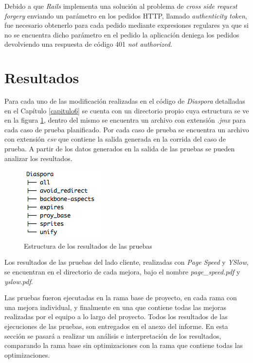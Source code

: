 Debido a que \emph{Rails} implementa una solución al problema de \emph{cross side request forgery}
enviando un parámetro en los pedidos HTTP, llamado \emph{authenticity token}, fue necesario obtenerlo
para cada pedido mediante expresiones regulares ya que si no se encuentra dicho parámetro en el pedido
la aplicación deniega los pedidos devolviendo una respuesta de código 401 \emph{not authorized}.
 
\section{Resultados}
\label{cap7:resultados}

Para cada uno de las modificación realizadas en el código de \emph{Diaspora} detalladas en el Capítulo \ref{capitulo6} se cuenta con un directorio propio cuya estructura se ve en la
figura \ref{fig.estructura_resultados}, dentro del mismo se encuentra un archivo con extensión \emph{.jmx} para cada caso de prueba planificado. Por cada caso de prueba se 
encuentra un archivo con extensión \emph{csv} que contiene la salida generada en la corrida del caso de prueba. A partir de los datos generados en la salida de las pruebas se 
pueden analizar los resultados.

\begin{figure}[h!]
\centering
\includegraphics[scale=0.5]{figuras/est_result.png}
  \caption{Estructura de los resultados de las pruebas}
    \label{fig.estructura_resultados}
\end{figure}

Los resultados de las pruebas del lado cliente, realizadas con \emph{Page Speed} y \emph{YSlow}, se encuentran en el directorio de cada mejora, bajo el nombre
\emph{page\_speed.pdf} y \emph{yslow.pdf}.

Las pruebas fueron ejecutadas en la rama base de proyecto, en cada rama con una mejora individual, y finalmente en una que contiene todas las mejoras realizadas por el
equipo a lo largo del proyecto. Todos los resultados de las ejecuciones de las pruebas, son entregados en el anexo del informe. En esta sección se pasará a realizar un
análisis e interpretación de los resultados, comparando la rama base sin optimizaciones con la rama que contiene todas las optimizaciones.

